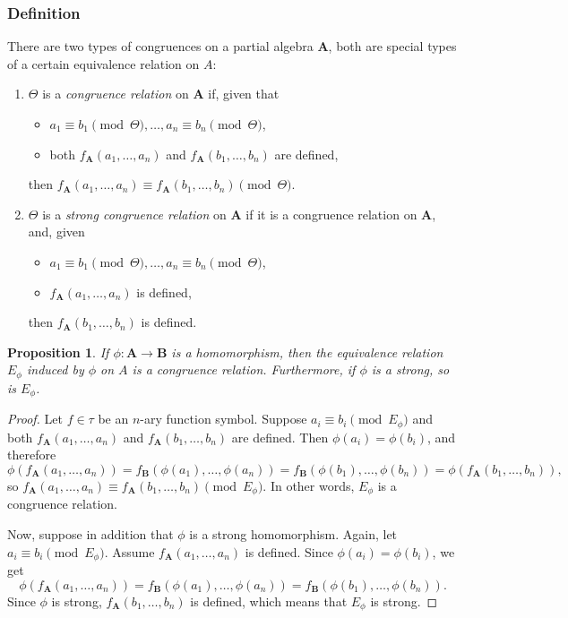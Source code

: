 \documentclass[12pt]{article}
\newtheorem{prop}{Proposition}
\begin{document}
\subsubsection*{Definition}

There are two types of congruences on a partial algebra $\boldsymbol{A}$, both are special types of a certain equivalence relation on $A$:
\begin{enumerate}
\item 
$\Theta$ is a \emph{congruence relation} on $\boldsymbol{A}$ if, given that 
\begin{itemize}
\item $a_1\equiv b_1 \pmod{\Theta}, \ldots, a_n \equiv b_n \pmod{\Theta}$,
\item both $f_{\boldsymbol{A}}(a_1,\ldots, a_n)$ and $f_{\boldsymbol{A}}(b_1,\ldots, b_n)$ are defined,
\end{itemize}
then $f_{\boldsymbol{A}}(a_1,\ldots, a_n) \equiv f_{\boldsymbol{A}}(b_1,\ldots, b_n) \pmod{\Theta}$.
\item
$\Theta$ is a \emph{strong congruence relation} on $\boldsymbol{A}$ if it is a congruence relation on $\boldsymbol{A}$, and, given 
\begin{itemize}
\item $a_1\equiv b_1 \pmod{\Theta}, \ldots, a_n \equiv b_n \pmod{\Theta}$, 
\item $f_{\boldsymbol{A}}(a_1,\ldots, a_n)$ is defined,
\end{itemize}
then $f_{\boldsymbol{A}}(b_1,\ldots, b_n)$ is defined.
\end{enumerate}

\begin{prop} If $\phi:\boldsymbol{A}\to \boldsymbol{B}$ is a homomorphism, then the equivalence relation $E_{\phi}$ induced by $\phi$ on $A$ is a congruence relation.  Furthermore, if $\phi$ is a strong, so is $E_{\phi}$. \end{prop}

\begin{proof}  
Let $f\in \tau$ be an $n$-ary function symbol.  Suppose $a_i \equiv b_i \pmod{E_{\phi}}$ and both $f_{\boldsymbol{A}}(a_1,\ldots, a_n)$ and $f_{\boldsymbol{A}}(b_1,\ldots, b_n)$ are defined.  Then $\phi(a_i)=\phi(b_i)$, and therefore $$\phi(f_{\boldsymbol{A}}(a_1,\ldots, a_n))= f_{\boldsymbol{B}}(\phi(a_1),\ldots, \phi(a_n))= f_{\boldsymbol{B}}(\phi(b_1),\ldots, \phi(b_n)) = \phi(f_{\boldsymbol{A}}(b_1,\ldots, b_n)),$$ so $f_{\boldsymbol{A}}(a_1,\ldots, a_n) \equiv f_{\boldsymbol{A}}(b_1,\ldots, b_n) \pmod{E_{\phi}}$.  In other words, $E_{\phi}$ is a congruence relation.

Now, suppose in addition that $\phi$ is a strong homomorphism.  Again, let $a_i \equiv b_i \pmod{E_{\phi}}$.  Assume $f_{\boldsymbol{A}}(a_1,\ldots, a_n)$ is defined.  Since $\phi(a_i)=\phi(b_i)$, we get $$\phi(f_{\boldsymbol{A}}(a_1,\ldots, a_n))= f_{\boldsymbol{B}}(\phi(a_1),\ldots, \phi(a_n))=f_{\boldsymbol{B}}(\phi(b_1),\ldots, \phi(b_n)).$$  Since $\phi$ is strong, $f_{\boldsymbol{A}}(b_1,\ldots, b_n)$ is defined, which means that $E_{\phi}$ is strong.
\end{proof}
\end{document}
